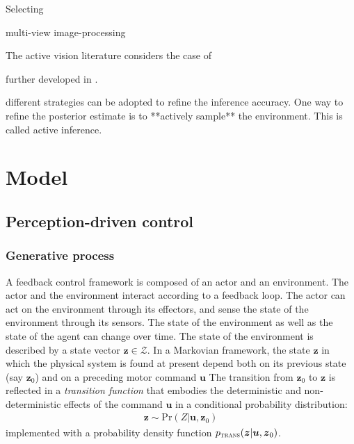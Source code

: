 \documentclass[12pt,twoside,openright]{article}
\begin{document}
Selecting 

multi-view image-processing

The active vision literature considers the case of 




further developed in \cite{najemnik2005optimal,butko2010infomax,ahmad2013active,potthast2016active}.



{ different strategies can be adopted to refine the inference accuracy. One way to refine the posterior estimate is to **actively sample** the environment. This is called active inference.} 



\section{Model}

\subsection{Perception-driven control}

\subsubsection{Generative process}
A feedback control framework is composed of an actor and an environment. The actor and the environment interact according to a feedback loop. 
The actor can act on the environment through its effectors, and sense the state of the environment through its sensors. 
The state of the environment as well as the state of the agent can change over time. The state of the environment is described by a state vector $\boldsymbol{z} \in \mathcal{Z}$.
In a Markovian framework, the state $\boldsymbol{z}$ in which the physical system is found at present depend both on its previous state (say $\boldsymbol{z}_0$) and on a preceding motor command $\boldsymbol{u}$ 
The transition from $\boldsymbol{z}_0$ to $\boldsymbol{z}$ is reflected in a \emph{transition function} that embodies the deterministic and non-deterministic effects of the command $\boldsymbol{u}$ in a conditional probability distribution:  
\begin{align}
\boldsymbol{z} \sim \text{Pr}(Z|\boldsymbol{u},\boldsymbol{z}_0) \label{eq:process}
\end{align}
implemented with a probability density function 
$p_\text{\sc trans}(\boldsymbol{z}|\boldsymbol{u},\boldsymbol{z}_0)$.
\end{document}
